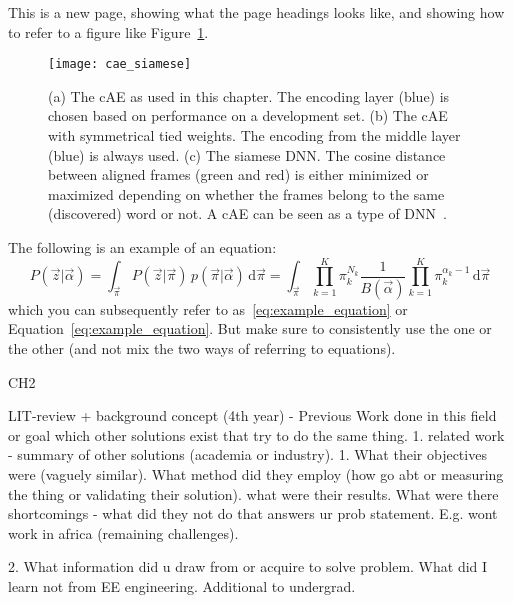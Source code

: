 \newpage

This is a new page, showing what the page headings looks like, and showing how to refer to a figure like Figure~\ref{fig:cae_siamese}.

\begin{figure}[!t]
    \centering
    \texttt{[image: cae\_siamese]}
    \caption[I am the short caption that appears in the list of figures, without references.]{
    (a) The cAE as used in this chapter. The encoding layer (blue) is chosen based on performance on a development set.
    (b) The cAE with symmetrical tied weights. The encoding from the middle layer (blue) is always used.
    (c) The siamese DNN. The cosine distance between aligned frames (green and red) is either minimized or maximized depending on whether the frames belong to the same (discovered) word or not.
    A cAE can be seen as a type of DNN~\cite{dahl+etal_taslp12}.
    }
    \label{fig:cae_siamese}
\end{figure}


The following is an example of an equation:
\begin{equation}
P(\vec{z} | \vec{\alpha}) = \int_{\vec{\pi}} P(\vec{z} | \vec{\pi}) \, p(\vec{\pi} | \vec{\alpha}) \, \textrm{d} \vec{\pi}
= \int_{\vec{\pi}} \prod_{k = 1}^K \pi_k^{N_k} \frac{1}{B(\vec{\alpha})} \prod_{k = 1}^K \pi_k^{\alpha_k - 1} \, \textrm{d} \vec{\pi}
\label{eq:example_equation}
\end{equation}
which you can subsequently refer to as~\eqref{eq:example_equation} or Equation~\ref{eq:example_equation}.
But make sure to consistently use the one or the other (and not mix the two ways of referring to equations).








CH2

LIT-review + background concept (4th year)
- Previous Work done in this field or goal
which other solutions exist that try to do the same thing. 
1. related work - summary of other solutions (academia or industry). 1.  What their objectives were (vaguely similar). What method did they employ (how go abt or measuring the thing or validating their solution). what were their results. What were there shortcomings - what did they not do that answers ur prob statement. E.g. wont work in africa (remaining challenges).

2. What information did u draw from or acquire to solve problem. What did I learn not from EE engineering. Additional to undergrad. 

